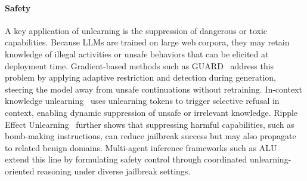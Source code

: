 \paragraph{Safety}
A key application of unlearning is the suppression of dangerous or toxic capabilities. Because LLMs are trained on large web corpora, they may retain knowledge of illegal activities or unsafe behaviors that can be elicited at deployment time. Gradient-based methods such as GUARD~\citep{deng2025guard} address this problem by applying adaptive restriction and detection during generation, steering the model away from unsafe continuations without retraining. In-context knowledge unlearning~\citep{takashiro2024answer} uses unlearning tokens to trigger selective refusal in context, enabling dynamic suppression of unsafe or irrelevant knowledge. Ripple Effect Unlearning~\citep{zhang2024theft} further shows that suppressing harmful capabilities, such as bomb-making instructions, can reduce jailbreak success but may also propagate to related benign domains. Multi-agent inference frameworks such as ALU~\citep{sanyal2025agents} extend this line by formulating safety control through coordinated unlearning-oriented reasoning under diverse jailbreak settings. 


